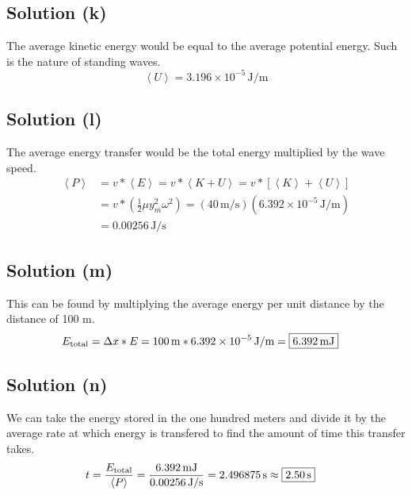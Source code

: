 \documentclass[12pt]{article}
\newcommand{\E}[1]{\times 10^{#1}}
\begin{document}
        \subsection{Solution (k)}
            The average kinetic energy would be equal to the average potential energy. 
            Such is the nature of standing waves.
            \begin{equation}
                \left\langle U \right\rangle    =   \boxed{3.196\E{-5}\,\unit{\joule/\meter}}
            \end{equation}

        \subsection{Solution (l)}
            The average energy transfer would be the total energy multiplied by the wave speed.
            \begin{align}
                \left\langle P \right\rangle    &=  v * \left\langle E \right\rangle
                    =   v * \left\langle K + U \right\rangle
                    =   v * \left[ \left\langle K \right\rangle + \left\langle U \right\rangle \right]\\
                    &=  v * \left( \frac{1}{2} \mu y_m^2 \omega^2 \right)
                    =   (40\,\unit{\meter/\second}) (6.392\E{-5}\,\unit{\joule/\meter})\\
                    &=  \boxed{0.00256\,\unit{\joule/\second}}
            \end{align}

        \subsection{Solution (m)}
            This can be found by multiplying the average energy per unit distance by the distance of 100 m. 
            \begin{align}
                E_{\rm total}   &=  \Delta x * E
                    =   100\,\unit{\meter} * 6.392\E{-5}\,\unit{\joule/\meter}
                    =   \boxed{6.392\,\unit{\milli\joule}}
            \end{align}

        \subsection{Solution (n)}
            We can take the energy stored in the one hundred meters and divide it by the average rate at which energy is transfered to find the amount of time this transfer takes. 
            \begin{align}
                t   &=  \frac{E_{\rm total}}{\left\langle P \right\rangle}
                    =   \frac{6.392\,\unit{\milli\joule}}{0.00256\,\unit{\joule/\second}}
                    =   2.496875\,\unit{\second}
                    \approx \boxed{2.50\,\unit{\second}}
            \end{align}
\end{document}
